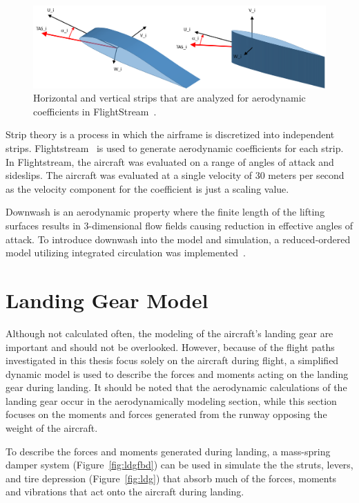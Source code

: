 \begin{figure}[!ht]\label{fig:strips}
    \centering
    \includegraphics[width=0.75\linewidth]{Figures/horvertstrips.png}
    \caption{Horizontal and vertical strips that are analyzed for aerodynamic coefficients in FlightStream~\cite{AerodynamicStripTheory2021}.}
\end{figure}

Strip theory is a process in which the airframe is discretized into independent strips. Flightstream~\cite{FlightStream} is used to generate aerodynamic coefficients for each strip. In Flightstream, the aircraft was evaluated on a range of angles of attack and sideslips. The aircraft was evaluated at a single velocity of 30 meters per second as the velocity component for the coefficient is just a scaling value.

Downwash is an aerodynamic property where the finite length of the lifting surfaces results in 3-dimensional flow fields causing reduction in effective angles of attack. To introduce downwash into the model and simulation, a reduced-ordered model utilizing integrated circulation was implemented~\cite{bhandariGeneticAlgorithmOptimization2023,ahujaIntegratedComputationalAeroacoustics2022}\@.

\section{Landing Gear Model}
Although not calculated often, the modeling of the aircraft's landing gear are important and should not be overlooked. However, because of the flight paths investigated in this thesis focus solely on the aircraft during flight, a simplified dynamic model is used to describe the forces and moments acting on the landing gear during landing. It should be noted that the aerodynamic calculations of the landing gear occur in the aerodynamically modeling section, while this section focuses on the moments and forces generated from the runway opposing the weight of the aircraft.

To describe the forces and moments generated during landing, a mass-spring damper system (Figure~\ref{fig:ldgfbd}) can be used in simulate the the struts, levers, and tire depression (Figure~\ref{fig:ldg}) that absorb much of the forces, moments and vibrations that act onto the aircraft during landing.

